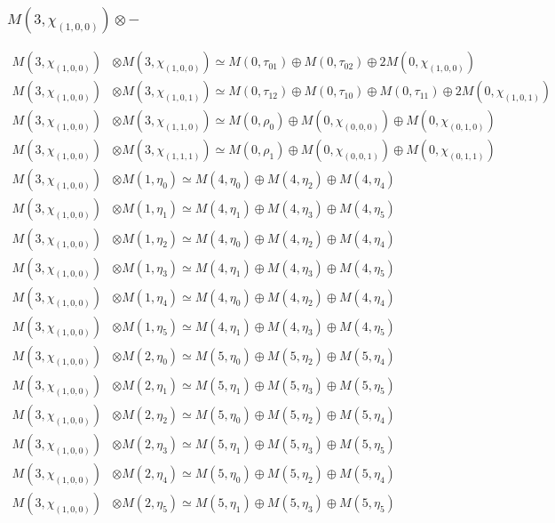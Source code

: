 \subsubsection{$ M(3,\chi_{(1,0,0)})\otimes -$}
\begin{align*}
M(3,\chi_{(1,0,0)}) &\otimes M(3,\chi_{(1,0,0)}) \simeq M(0,\tau_{01}) \oplus M(0,\tau_{02}) \oplus 2 M(0,\chi_{(1,0,0)}) \\
M(3,\chi_{(1,0,0)}) &\otimes M(3,\chi_{(1,0,1)}) \simeq M(0,\tau_{12}) \oplus M(0,\tau_{10}) \oplus M(0,\tau_{11}) \oplus 2 M(0,\chi_{(1,0,1)}) \\
M(3,\chi_{(1,0,0)}) &\otimes M(3,\chi_{(1,1,0)}) \simeq M(0,\rho_{0}) \oplus M(0,\chi_{(0,0,0)}) \oplus M(0,\chi_{(0,1,0)}) \\
M(3,\chi_{(1,0,0)}) &\otimes M(3,\chi_{(1,1,1)}) \simeq M(0,\rho_{1}) \oplus M(0,\chi_{(0,0,1)}) \oplus M(0,\chi_{(0,1,1)}) \\
M(3,\chi_{(1,0,0)}) &\otimes M(1,\eta_{0}) \simeq M(4,\eta_{0}) \oplus M(4,\eta_{2}) \oplus M(4,\eta_{4}) \\
M(3,\chi_{(1,0,0)}) &\otimes M(1,\eta_{1}) \simeq M(4,\eta_{1}) \oplus M(4,\eta_{3}) \oplus M(4,\eta_{5}) \\
M(3,\chi_{(1,0,0)}) &\otimes M(1,\eta_{2}) \simeq M(4,\eta_{0}) \oplus M(4,\eta_{2}) \oplus M(4,\eta_{4}) \\
M(3,\chi_{(1,0,0)}) &\otimes M(1,\eta_{3}) \simeq M(4,\eta_{1}) \oplus M(4,\eta_{3}) \oplus M(4,\eta_{5}) \\
M(3,\chi_{(1,0,0)}) &\otimes M(1,\eta_{4}) \simeq M(4,\eta_{0}) \oplus M(4,\eta_{2}) \oplus M(4,\eta_{4}) \\
M(3,\chi_{(1,0,0)}) &\otimes M(1,\eta_{5}) \simeq M(4,\eta_{1}) \oplus M(4,\eta_{3}) \oplus M(4,\eta_{5}) \\
M(3,\chi_{(1,0,0)}) &\otimes M(2,\eta_{0}) \simeq M(5,\eta_{0}) \oplus M(5,\eta_{2}) \oplus M(5,\eta_{4}) \\
M(3,\chi_{(1,0,0)}) &\otimes M(2,\eta_{1}) \simeq M(5,\eta_{1}) \oplus M(5,\eta_{3}) \oplus M(5,\eta_{5}) \\
M(3,\chi_{(1,0,0)}) &\otimes M(2,\eta_{2}) \simeq M(5,\eta_{0}) \oplus M(5,\eta_{2}) \oplus M(5,\eta_{4}) \\
M(3,\chi_{(1,0,0)}) &\otimes M(2,\eta_{3}) \simeq M(5,\eta_{1}) \oplus M(5,\eta_{3}) \oplus M(5,\eta_{5}) \\
M(3,\chi_{(1,0,0)}) &\otimes M(2,\eta_{4}) \simeq M(5,\eta_{0}) \oplus M(5,\eta_{2}) \oplus M(5,\eta_{4}) \\
M(3,\chi_{(1,0,0)}) &\otimes M(2,\eta_{5}) \simeq M(5,\eta_{1}) \oplus M(5,\eta_{3}) \oplus M(5,\eta_{5}) \\

\end{align*}
